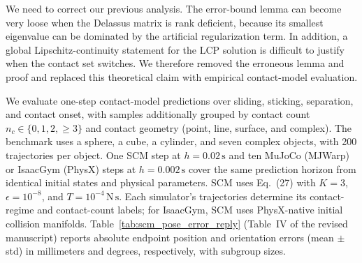 \documentclass[journal,10pt]{IEEEtran}
\begin{document}
We need to correct our previous analysis. The error-bound lemma can become very loose when the Delassus matrix is rank deficient, because its smallest eigenvalue can be dominated by the artificial regularization term. In addition, a global Lipschitz-continuity statement for the LCP solution is difficult to justify when the contact set switches. We therefore removed the erroneous lemma and proof and replaced this theoretical claim with empirical contact-model evaluation.

We evaluate one-step contact-model predictions over sliding, sticking, separation, and contact onset, with samples additionally grouped by contact count $n_c\in\{0,1,2,\geq3\}$ and contact geometry (point, line, surface, and complex). The benchmark uses a sphere, a cube, a cylinder, and seven complex objects, with 200 trajectories per object. One SCM step at $h=0.02\,\mathrm{s}$ and ten MuJoCo (MJWarp) or IsaacGym (PhysX) steps at $h=0.002\,\mathrm{s}$ cover the same prediction horizon from identical initial states and physical parameters. SCM uses Eq.~(27) with $K=3$, $\epsilon=10^{-8}$, and $T=10^{-4}\,\mathrm{N\,s}$. Each simulator's trajectories determine its contact-regime and contact-count labels; for IsaacGym, SCM uses PhysX-native initial collision manifolds. Table~\ref{tab:scm_pose_error_reply} (Table~IV of the revised manuscript) reports absolute endpoint position and orientation errors (mean $\pm$ std) in millimeters and degrees, respectively, with subgroup sizes.
\end{document}
